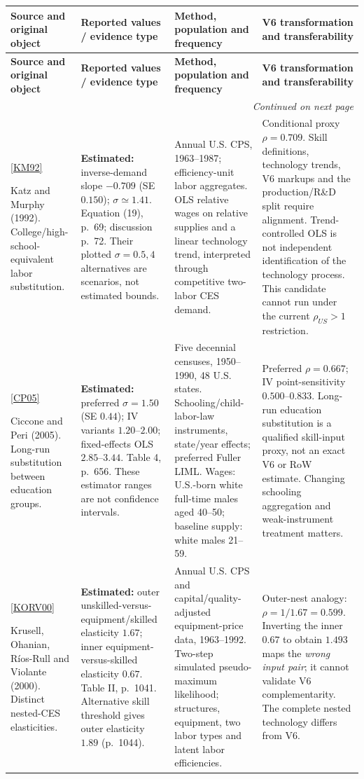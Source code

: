 \documentclass[10pt,a4paper,landscape]{article}
\makeatletter
\newcommand{\src}[1]{\hyperlink{ref:#1}{\textsf{[#1]}}}
\newenvironment{evidence}{%
\fontsize{9.4}{10.9}\selectfont\setlength{\parskip}{2pt}
\begin{longtable}{@{}P{\dimexpr .22\textwidth-7.5pt\relax}P{\dimexpr .24\textwidth-7.5pt\relax}P{\dimexpr .25\textwidth-7.5pt\relax}P{\dimexpr .29\textwidth-7.5pt\relax}@{}}
\toprule\rowcolor{tablehead}\textbf{Source and original object} & \textbf{Reported values / evidence type} & \textbf{Method, population and frequency} & \textbf{V6 transformation and transferability}\\\midrule
\endfirsthead
\toprule\rowcolor{tablehead}\textbf{Source and original object} & \textbf{Reported values / evidence type} & \textbf{Method, population and frequency} & \textbf{V6 transformation and transferability}\\\midrule
\endhead
\midrule\multicolumn{4}{r}{\footnotesize\itshape Continued on next page}\\\endfoot
\bottomrule\endlastfoot
}{\end{longtable}}
\makeatother
\begin{document}
\begin{evidence}
\src{KM92}\par Katz and Murphy (1992). College/high-school-equivalent labor substitution.
& \textbf{Estimated:} inverse-demand slope $-0.709$ (SE $0.150$); $\sigma\simeq1.41$. Equation (19), p.\ 69; discussion p.\ 72. Their plotted $\sigma=0.5,4$ alternatives are scenarios, not estimated bounds.
& Annual U.S. CPS, 1963--1987; efficiency-unit labor aggregates. OLS relative wages on relative supplies and a linear technology trend, interpreted through competitive two-labor CES demand.
& Conditional proxy $\rho=0.709$. Skill definitions, technology trends, V6 markups and the production/R\&D split require alignment. Trend-controlled OLS is not independent identification of the technology process. This candidate cannot run under the current $\rho_{US}>1$ restriction.\\[4pt]

\src{CP05}\par Ciccone and Peri (2005). Long-run substitution between education groups.
& \textbf{Estimated:} preferred $\sigma=1.50$ (SE $0.44$); IV variants $1.20$--$2.00$; fixed-effects OLS $2.85$--$3.44$. Table 4, p.\ 656. These estimator ranges are not confidence intervals.
& Five decennial censuses, 1950--1990, 48 U.S. states. Schooling/child-labor-law instruments, state/year effects; preferred Fuller LIML. Wages: U.S.-born white full-time males aged 40--50; baseline supply: white males 21--59.
& Preferred $\rho=0.667$; IV point-sensitivity $0.500$--$0.833$. Long-run education substitution is a qualified skill-input proxy, not an exact V6 or RoW estimate. Changing schooling aggregation and weak-instrument treatment matters.\\[4pt]

\src{KORV00}\par Krusell, Ohanian, R\'{i}os-Rull and Violante (2000). Distinct nested-CES elasticities.
& \textbf{Estimated:} outer unskilled-versus-equipment/skilled elasticity $1.67$; inner equipment-versus-skilled elasticity $0.67$. Table II, p.\ 1041. Alternative skill threshold gives outer elasticity $1.89$ (p.\ 1044).
& Annual U.S. CPS and capital/quality-adjusted equipment-price data, 1963--1992. Two-step simulated pseudo-maximum likelihood; structures, equipment, two labor types and latent labor efficiencies.
& Outer-nest analogy: $\rho=1/1.67=0.599$. Inverting the inner $0.67$ to obtain $1.493$ maps the \emph{wrong input pair}; it cannot validate V6 complementarity. The complete nested technology differs from V6.\\[4pt]


\end{evidence}
\end{document}

